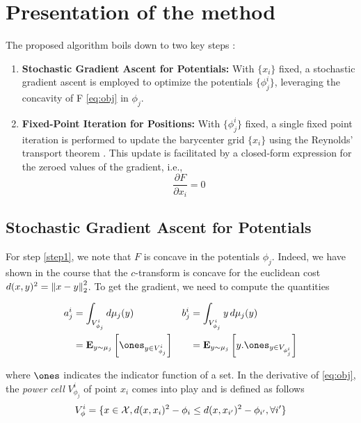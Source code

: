 \section{Presentation of the method}
\label{sec:method}

The proposed algorithm \cite{claici_stochastic_2018} boils down to two key steps :
\begin{enumerate}
    \item \label{step1} \textbf{Stochastic Gradient Ascent for Potentials:} With $\lbrace x_i \rbrace$ fixed, a stochastic gradient ascent is employed to optimize the potentials $\lbrace \phi_j^i \rbrace$, leveraging the concavity of F \eqref{eq:obj} in $\phi_j$.
    \item \textbf{Fixed-Point Iteration for Positions:} With $\lbrace \phi_j^i \rbrace$ fixed, a single fixed point iteration is performed to update the barycenter grid $\lbrace x_i \rbrace$ using the Reynolds' transport theorem \cite{claici_stochastic_2018}. This update is facilitated by a closed-form expression for the zeroed values of the gradient, i.e., $$\frac{\partial F}{\partial x_i} = 0$$
\end{enumerate}

\subsection{Stochastic Gradient Ascent for Potentials}

For step \ref{step1}, we note that $F$ is concave in the potentials $\phi_j$. Indeed, we have shown in the course \cite{peyre_computational_2020} that the $c$-transform is concave for the euclidean cost $d(x, y)^2 = \left\lVert x - y\right\rVert_2^2$. 
To get the gradient, we need to compute the quantities 


\begin{align*}
    a^i_j &= \int_{V_{\phi_j}^i} d\mu_j(y) & b_j^i &= \int_{V_{\phi_j}^i} y\, d\mu_j(y) \\
     &= \E_{y \sim \mu_j}\left[ \ones_{y\in V_{\phi_j}^i}\right] & & =\E_{y \sim \mu_j}\left[ y . \ones_{y\in V_{\phi_j^i}}\right] \\
\end{align*}

where $\ones$ indicates the indicator function of a set. In the derivative of \eqref{eq:obj}, the \textit{power cell} $V_{\phi_j}^i$ of point $x_i$ comes into play and is defined as follows
$$
V_{\phi}^i = \lbrace x\in\mathcal{X}, d(x, x_i)^2 - \phi_i \leq d(x, x_{i'})^2 - \phi_{i'}, \forall i'  \rbrace
$$

